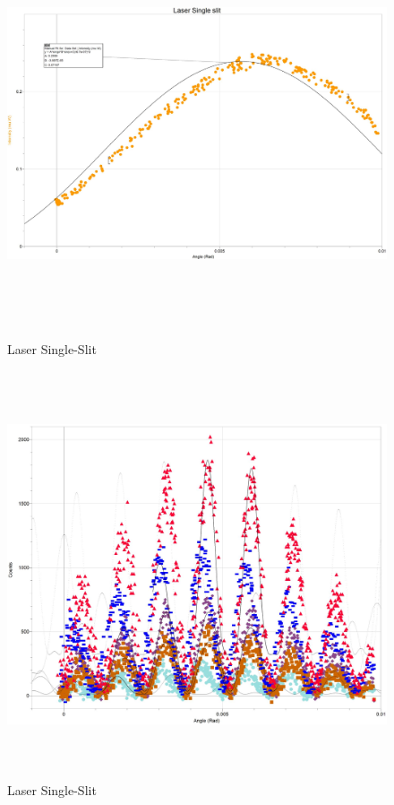 \documentclass[fleqn]{article}
\begin{document}
  \pagebreak

  \begin{figure}[h!]
    \includegraphics[height=12cm, width=18cm]{Fig2.JPG}
    \caption{
      Laser Single-Slit
    }
  \end{figure}

  \pagebreak

  \begin{figure}[h!]
    \includegraphics[height=12cm, width=18cm]{Fig3Top.JPG}
    \caption{
      Laser Single-Slit
    }
  \end{figure}
\end{document}
